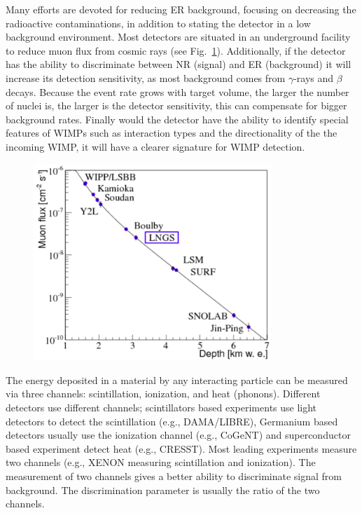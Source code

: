 Many efforts are devoted for reducing ER background, focusing on decreasing the radioactive contaminations, in addition to stating the detector in a low background environment. Most detectors are situated in an underground facility to reduce muon flux from cosmic rays (see Fig.~\ref{fig:MuonRed}). Additionally, if the detector has the ability to discriminate between NR (signal) and ER (background) it will increase its detection sensitivity, as most background comes from $\gamma$-rays and $\beta$ decays. Because the event rate grows with target volume, the larger the number of nuclei is, the larger is the detector sensitivity, this can compensate for bigger background rates. Finally would the detector have the ability to identify special features of WIMPs such as interaction types and the directionality of the the incoming WIMP, it will have a clearer signature for WIMP detection.

\begin{figure}[]
	\centering
	\includegraphics[width=0.8\textwidth]{figs/muones.png}
	\label{fig:MuonRed}
\end{figure}

The energy deposited in a material by any interacting particle can be measured via three channels: scintillation, ionization, and heat (phonons). Different detectors use different channels; scintillators based experiments use light detectors to detect the scintillation (e.g., DAMA/LIBRE), Germanium based detectors usually use the ionization channel (e.g., CoGeNT) and superconductor based experiment detect heat (e.g., CRESST). Most leading experiments measure two channels (e.g., XENON measuring scintillation and ionization). The measurement of two channels gives a better ability to discriminate signal from background. The discrimination parameter is usually the ratio of the two channels.  

